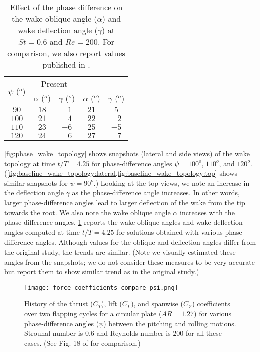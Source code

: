 \begin{table}[!h]
  \centering
  \begin{tabular}{ccccc}
    \hline\hline
    \multirow{2}{*}{$\psi$ ($^o$)} &
      \multicolumn{2}{c}{Present} &
      \multicolumn{2}{c}{\citet{li_dong_2016}} \\
    & $\alpha$ ($^o$) & $\gamma$ ($^o$) & $\alpha$ ($^o$) & $\gamma$ ($^o$) \\
    \hline
    $90$ & $18$ & $-1$ & $21$ & $5$ \\
    $100$ & $21$ & $-4$ & $22$ & $-2$ \\
    $110$ & $23$ & $-6$ & $25$ & $-5$ \\
    $120$ & $24$ & $-6$ & $27$ & $-7$ \\
    \hline\hline
  \end{tabular}
  \caption{Effect of the phase difference on the wake oblique angle ($\alpha$) and wake deflection angle ($\gamma$) at $St = 0.6$ and $Re = 200$. For comparison, we also report values published in \citet{li_dong_2016}.}
  \label{tab:phase_angles}
\end{table}

\cref{fig:phase_wake_topology} shows snapshots (lateral and side views) of the wake topology at time $t/T = 4.25$ for phase-difference angles $\psi = 100^o$, $110^o$, and $120^o$.
(\cref{fig:baseline_wake_topology:lateral,fig:baseline_wake_topology:top} shows similar snapshots for $\psi = 90^o$.)
Looking at the top views, we note an increase in the deflection angle $\gamma$ as the phase-difference angle increases.
In other words, larger phase-difference angles lead to larger deflection of the wake from the tip towards the root.
We also note the wake oblique angle $\alpha$ increases with the phase-difference angles.
\cref{tab:phase_angles} reports the wake oblique angles and wake deflection angles computed at time $t/T = 4.25$ for solutions obtained with various phase-difference angles.
Although values for the oblique and deflection angles differ from the original study, the trends are similar.
(Note we visually estimated these angles from the snapshots; we do not consider these measures to be very accurate but report them to show similar trend as in the original study.)

\begin{figure}[!h]
  \centering
  \texttt{[image: force\_coefficients\_compare\_psi.png]}
  \caption{History of the thrust ($C_T$), lift ($C_L$), and spanwise ($C_Z$) coefficients over two flapping cycles for a circular plate ($AR = 1.27$) for various phase-difference angles ($\psi$) between the pitching and rolling motions. Strouhal number is $0.6$ and Reynolds number is $200$ for all these cases. (See Fig. 18 of \citet{li_dong_2016} for comparison.)}
  \label{fig:phase_force_coefficients}
\end{figure}

